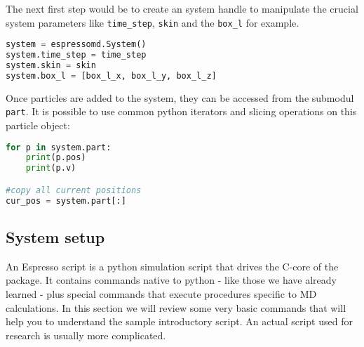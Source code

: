 \documentclass[
paper=a4,                       %
fontsize=11pt,                  %
twoside,                        %
footsepline,                    %
headsepline,                    %
headinclude=false,              %
footinclude=false,              %
pagesize,                       %
]{scrartcl}
\begin{document}
The next first step would be to create an \es{} system handle to manipulate the
crucial system parameters like \texttt{time\_step}, \texttt{skin} and the
\texttt{box\_l} for example. 
\begin{lstlisting}[language=Python]
system = espressomd.System()
system.time_step = time_step
system.skin = skin
system.box_l = [box_l_x, box_l_y, box_l_z]
\end{lstlisting}

Once particles are added to the system, they can be accessed from the submodul
\texttt{part}. It is possible to use common python iterators and slicing operations
on this particle object:
\begin{lstlisting}[language=Python]
for p in system.part:
    print(p.pos)
    print(p.v)

#copy all current positions
cur_pos = system.part[:]
\end{lstlisting}



 \subsection{System setup}\label{sec:ljliquid}

  An Espresso script is a python simulation script that drives 
  the C-core of the package. It contains commands native to python - like those we
  have already learned - plus special \es{} commands that execute procedures
  specific to MD calculations. In this section we will review some very basic
  commands
   that will help you to understand the sample introductory script. An actual
   script used for research is usually more complicated.
\end{document}
